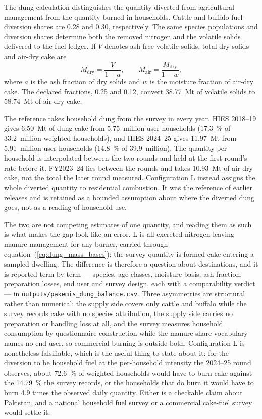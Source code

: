 \documentclass[essd]{copernicus}
\begin{document}
The dung calculation distinguishes the quantity diverted from agricultural management from the quantity burned in households. Cattle and buffalo fuel-diversion shares are 0.28 and 0.30, respectively. The same species populations and diversion shares determine both the removed nitrogen and the volatile solids delivered to the fuel ledger. If $V$ denotes ash-free volatile solids, total dry solids and air-dry cake are
\begin{equation}
 M_{\mathrm{dry}}=\frac{V}{1-a},\qquad
 M_{\mathrm{air}}=\frac{M_{\mathrm{dry}}}{1-w},
 \label{eq:dung_mass_bases}
\end{equation}
where $a$ is the ash fraction of dry solids and $w$ is the moisture fraction of air-dry cake. The declared fractions, 0.25 and 0.12, convert 38.77~Mt of volatile solids to 58.74~Mt of air-dry cake.

The reference takes household dung from the survey in every year. HIES 2018--19 gives 6.50~Mt of dung cake from 5.75~million user households (\SI{17.3}{\percent} of 33.2~million weighted households), and HIES 2024--25 gives 11.97~Mt from 5.91~million user households (\SI{14.8}{\percent} of 39.9~million). The quantity per household is interpolated between the two rounds and held at the first round's rate before it. FY2023--24 lies between the rounds and takes \SI{10.93}{\mega\tonne} of air-dry cake, not the total the later round measured. Configuration L instead assigns the whole diverted quantity to residential combustion. It was the reference of earlier releases and is retained as a bounded assumption about where the diverted dung goes, not as a reading of household use.

The two are not competing estimates of one quantity, and reading them as such is what makes the gap look like an error. L is all excreted nitrogen leaving manure management for any burner, carried through equation~(\ref{eq:dung_mass_bases}); the survey quantity is formed cake entering a sampled dwelling. The difference is therefore a question about destinations, and it is reported term by term --- species, age classes, moisture basis, ash fraction, preparation losses, end user and survey design, each with a comparability verdict --- in \texttt{outputs/pakemis\_dung\_balance.csv}. Three asymmetries are structural rather than numerical: the supply side covers only cattle and buffalo while the survey records cake with no species attribution, the supply side carries no preparation or handling loss at all, and the survey measures household consumption by questionnaire construction while the manure-share vocabulary names no end user, so commercial burning is outside both. Configuration L is nonetheless falsifiable, which is the useful thing to state about it: for the diversion to be household fuel at the per-household intensity the 2024--25 round observes, about \SI{72.6}{\percent} of weighted households would have to burn cake against the \SI{14.79}{\percent} the survey records, or the households that do burn it would have to burn \num{4.9} times the observed daily quantity. Either is a checkable claim about Pakistan, and a national household fuel survey or a commercial cake-fuel survey would settle it.
\end{document}
